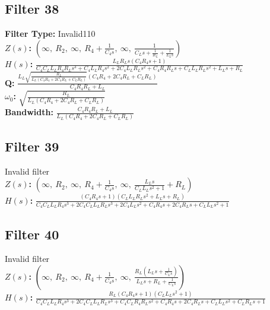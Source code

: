 \documentclass{article}
\begin{document}
\subsection*{Filter 38}
\textbf{Filter Type:} Invalid110 \\ 
\textbf{$Z(s)$:} $\left( \infty, \  R_{2}, \  \infty, \  R_{4} + \frac{1}{C_{4} s}, \  \infty, \  \frac{1}{C_{L} s + \frac{1}{R_{L}} + \frac{1}{L_{L} s}}\right)$ \\ 
\textbf{$H(s)$:} $\frac{L_{L} R_{L} s \left(C_{4} R_{4} s + 1\right)}{C_{4} C_{L} L_{L} R_{4} R_{L} s^{3} + C_{4} L_{L} R_{4} s^{2} + 2 C_{4} L_{L} R_{L} s^{2} + C_{4} R_{4} R_{L} s + C_{L} L_{L} R_{L} s^{2} + L_{L} s + R_{L}}$ \\ 
\textbf{Q:} $\frac{L_{L} \sqrt{\frac{R_{L}}{L_{L} \left(C_{4} R_{4} + 2 C_{4} R_{L} + C_{L} R_{L}\right)}} \left(C_{4} R_{4} + 2 C_{4} R_{L} + C_{L} R_{L}\right)}{C_{4} R_{4} R_{L} + L_{L}}$ \\ 
\textbf{$\omega_0$:} $\sqrt{\frac{R_{L}}{L_{L} \left(C_{4} R_{4} + 2 C_{4} R_{L} + C_{L} R_{L}\right)}}$ \\ 
\textbf{Bandwidth:} $\frac{C_{4} R_{4} R_{L} + L_{L}}{L_{L} \left(C_{4} R_{4} + 2 C_{4} R_{L} + C_{L} R_{L}\right)}$ \\ 
\subsection*{Filter 39}
Invalid filter \\ 
\textbf{$Z(s)$:} $\left( \infty, \  R_{2}, \  \infty, \  R_{4} + \frac{1}{C_{4} s}, \  \infty, \  \frac{L_{L} s}{C_{L} L_{L} s^{2} + 1} + R_{L}\right)$ \\ 
\textbf{$H(s)$:} $\frac{\left(C_{4} R_{4} s + 1\right) \left(C_{L} L_{L} R_{L} s^{2} + L_{L} s + R_{L}\right)}{C_{4} C_{L} L_{L} R_{4} s^{3} + 2 C_{4} C_{L} L_{L} R_{L} s^{3} + 2 C_{4} L_{L} s^{2} + C_{4} R_{4} s + 2 C_{4} R_{L} s + C_{L} L_{L} s^{2} + 1}$ \\ 
\subsection*{Filter 40}
Invalid filter \\ 
\textbf{$Z(s)$:} $\left( \infty, \  R_{2}, \  \infty, \  R_{4} + \frac{1}{C_{4} s}, \  \infty, \  \frac{R_{L} \left(L_{L} s + \frac{1}{C_{L} s}\right)}{L_{L} s + R_{L} + \frac{1}{C_{L} s}}\right)$ \\ 
\textbf{$H(s)$:} $\frac{R_{L} \left(C_{4} R_{4} s + 1\right) \left(C_{L} L_{L} s^{2} + 1\right)}{C_{4} C_{L} L_{L} R_{4} s^{3} + 2 C_{4} C_{L} L_{L} R_{L} s^{3} + C_{4} C_{L} R_{4} R_{L} s^{2} + C_{4} R_{4} s + 2 C_{4} R_{L} s + C_{L} L_{L} s^{2} + C_{L} R_{L} s + 1}$ \\ 
\end{document}
